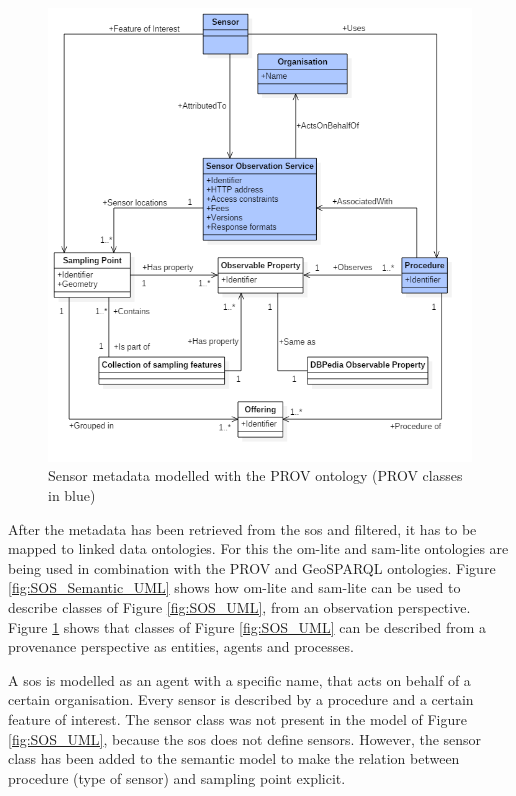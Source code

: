 \begin{figure}
	\centering
	\includegraphics[width=1\linewidth]{UML/SOS_Semantic_UML_3.PNG}
	\caption{Sensor metadata modelled with the PROV ontology (PROV classes in blue)}
	\label{fig:SOS_Semantic_UML2}
\end{figure}

After the metadata has been retrieved from the \ac{sos} and filtered, it has to be mapped to linked data ontologies. For this the om-lite and sam-lite ontologies are being used in combination with the PROV and GeoSPARQL ontologies. Figure \ref{fig:SOS_Semantic_UML} shows how om-lite and sam-lite can be used to describe classes of Figure \ref{fig:SOS_UML}, from an observation perspective. Figure \ref{fig:SOS_Semantic_UML2} shows that classes of Figure \ref{fig:SOS_UML} can be described from a provenance perspective as entities, agents and processes.     

A \ac{sos} is modelled as an agent with a specific name, that acts on behalf of a certain organisation. Every sensor is described by a procedure and a certain feature of interest. The sensor class was not present in the model of Figure \ref{fig:SOS_UML}, because the \ac{sos} does not define sensors. However, the sensor class has been added to the semantic model to make the relation between procedure (type of sensor) and sampling point explicit. 

